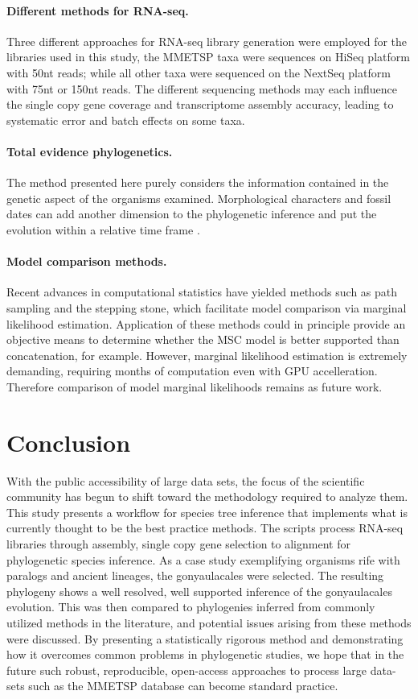\documentclass[12pt]{article}
\begin{document}
\paragraph*{Different methods for RNA-seq.} 
Three different approaches for RNA-seq library generation were employed for the libraries used in this study, the MMETSP taxa were sequences on HiSeq platform with 50nt reads; while all other taxa were sequenced on the NextSeq platform with 75nt or 150nt reads. 
The different sequencing methods may each influence the single copy gene coverage and transcriptome assembly accuracy, leading to systematic error and batch effects on some taxa.
\paragraph*{Total evidence phylogenetics.}
The method presented here purely considers the information contained in the genetic aspect of the organisms examined. 
Morphological characters and fossil dates can add another dimension to the phylogenetic inference and put the evolution within a relative time frame \cite{gavryushkina2017bayesian}.  
\paragraph*{Model comparison methods.}
Recent advances in computational statistics have yielded methods such as path sampling and the stepping stone, which facilitate model comparison via marginal likelihood estimation. 
Application of these methods could in principle provide an objective means to determine whether the MSC model is better supported than concatenation, for example.
However, marginal likelihood estimation is extremely demanding, requiring months of computation even with GPU accelleration.
Therefore comparison of model marginal likelihoods remains as future work.

\newpage
\section{Conclusion}
With the public accessibility of large data sets, the focus of the scientific community has begun to shift toward the methodology required to analyze them. 
This study presents a workflow for species tree inference that implements what is currently thought to be the best practice methods. 
The scripts process RNA-seq libraries through assembly, single copy gene selection to alignment for phylogenetic species inference. 
As a case study exemplifying organisms rife with paralogs and ancient lineages, the gonyaulacales were selected. 
The resulting phylogeny shows a well resolved, well supported inference of the gonyaulacales evolution. 
This was then compared to phylogenies inferred from commonly utilized methods in the literature, and potential issues arising from these methods were discussed. 
By presenting a statistically rigorous method and demonstrating how it overcomes common problems in phylogenetic studies, we hope that in the future such robust, reproducible, open-access approaches to process large data-sets such as the MMETSP database can become standard practice.
\newpage
\end{document}

